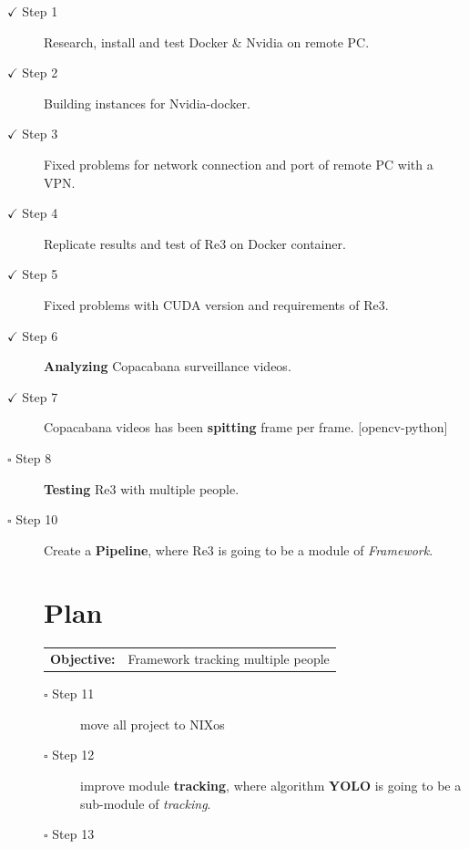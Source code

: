 \documentclass[a4paper]{article}
\begin{document}
\begin{description}
\item [$\checkmark$ Step 1] Research, install and test Docker \& Nvidia on remote PC.
\item[$\checkmark$ Step 2] Building instances for Nvidia-docker.
\item[$\checkmark$ Step 3] Fixed problems for network connection and port of remote PC  with a VPN.
\item[$\checkmark$ Step 4] Replicate results and test of Re3 \cite{re3} on Docker container.
\item[$\checkmark$ Step 5] Fixed problems with CUDA version and requirements of Re3.
\item[$\checkmark$ Step 6] \textbf{Analyzing} Copacabana surveillance videos.
\item[$\checkmark$ Step 7] Copacabana videos has been \textbf{spitting} frame per frame. [opencv-python]
\item[$\square$ Step 8] \textbf{Testing} Re3 with multiple people.
\item[$\square$ Step 10] Create a \textbf{Pipeline}, where Re3 is going to be a module of \textit{Framework}.
 


\section{Plan}

\begin{tabular}{rl}
	\textbf{Objective:} & Framework tracking multiple people \\
\end{tabular}


    \begin{description}
        \item[$\square$ Step 11] move all project to NIXos
        \item[$\square$ Step 12] improve module \textbf{tracking}, where algorithm      \textbf{YOLO} is going to be a sub-module of \textit{tracking}.
        \item[$\square$ Step 13]  
    \end{description}
\end{description}
\end{document}
